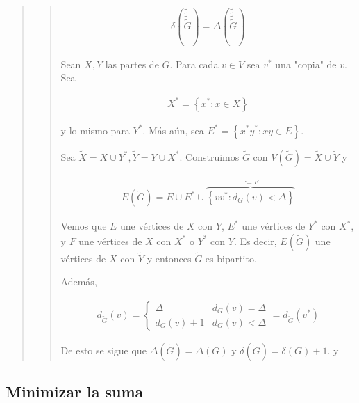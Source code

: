 \documentclass[a4paper]{article}
\begin{document}
\begin{quote}
\begin{quote}
\begin{align*}
    \delta(\widetilde{ \widetilde{ \widetilde{ \widetilde{ G }} } }) = \Delta(\widetilde{ \widetilde{ \widetilde{ \widetilde{ G } } } })
\end{align*}

Sean $X, Y$ las partes de $G$. Para cada $v \in V$ sea $v^*$ una "copia" de $v$. Sea 

\begin{align*}
    X^* = \left\{ x^* : x \in X \right\} 
\end{align*}

y lo mismo para $Y^*$. Más aún, sea $E^* = \left\{ x^*y^* : xy \in E \right\}
$. 

Sea $\widetilde{ X } = X \cup Y^*, \widetilde{ Y } = Y \cup X^*$. Construimos $\widetilde{ G }$ con $V(\widetilde{ G }) = \widetilde{ X } \cup \widetilde{ Y }$ y 

\begin{align*}
    E(\widetilde{ G }) = E \cup  E^* \cup  \overbrace{\left\{ v v^* : d_G(v) < \Delta \right\} }^{:= F}
\end{align*}

Vemos que $E$ une vértices de $X$ con $Y$, $E^*$ une vértices de $Y^*$ con
$X^*$, y $F$ une vértices de $X$ con $X^*$ o $Y^*$ con $Y$. Es decir,
$E(\widetilde{ G })$ une vértices de $\widetilde{ X }$ con $\widetilde{ Y }$ y entonces
$\widetilde{ G }$ es bipartito.

Además, 

\begin{align*}
    d_{\widetilde{ G }}(v) = \begin{cases}
        \Delta & d_G(v) = \Delta \\ 
        d_G(v) + 1 & d_G(v) < \Delta
    \end{cases} = d_{\widetilde{ G }}(v^*)
\end{align*}

De esto se sigue que $\Delta(\widetilde{ G }) = \Delta(G)$ y $\delta(\widetilde{ G }) = \delta(G) + 1$.
y 






\end{quote}
\normalsize


\end{quote}
\normalsize



\subsection{Minimizar la suma}
\end{document}
